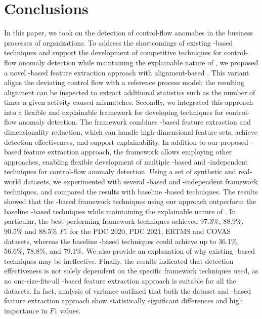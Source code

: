 \section{Conclusions}
\label{sec:conclusions}
In this paper, we took on the detection of control-flow anomalies in the business processes of organizations. To address the shortcomings of existing -based techniques and support the development of competitive techniques for control-flow anomaly detection while maintaining the explainable nature of , we proposed a novel -based feature extraction approach with alignment-based . This  variant aligns the deviating control flow with a reference process model; the resulting alignment can be inspected to extract additional statistics such as the number of times a given activity caused mismatches. Secondly, we integrated this approach into a flexible and explainable framework for developing techniques for control-flow anomaly detection. The framework combines -based feature extraction and dimensionality reduction, which can handle high-dimensional feature sets, achieve detection effectiveness, and support explainability. In addition to our proposed -based feature extraction approach, the framework allows employing other approaches, enabling flexible development of multiple -based and -independent techniques for control-flow anomaly detection. Using a set of synthetic and real-world datasets, we experimented with several -based and -independent framework techniques, and compared the results with baseline -based techniques. The results showed that the -based framework techniques using our approach outperform the baseline -based techniques while maintaining the explainable nature of . In particular, the best-performing framework techniques achieved 97.3\%, 88.9\%, 90.5\% and 88.5\% $F1$ for the PDC 2020, PDC 2021, ERTMS and COVAS datasets, whereas the baseline -based techniques could achieve up to 36.1\%, 56.6\%, 78.8\%, and 79.1\%. We also provide an explanation of why existing -based techniques may be ineffective. Finally, the results indicated that detection effectiveness is not solely dependent on the specific framework techniques used, as no one-size-fits-all -based feature extraction approach is suitable for all the datasets. In fact, analysis of variance outlined that both the dataset and -based feature extraction approach show statistically significant differences and high importance in $F1$ values.

